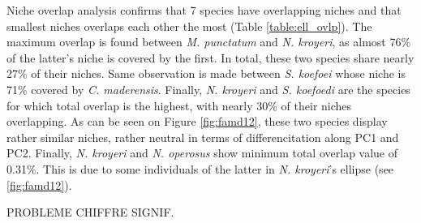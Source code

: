 Niche overlap analysis confirms that 7 species have overlapping niches and that smallest niches overlaps each other the most (Table \ref{table:ell_ovlp}). The maximum overlap is found between \textit{M. punctatum} and \textit{N. kroyeri}, as almost 76\% of the latter's niche is covered by the first. In total, these two species share nearly 27\% of their niches. Same observation is made between \textit{S. koefoei} whose niche is 71\% covered by \textit{C. maderensis}. Finally, \textit{N. kroyeri} and \textit{S. koefoedi} are the species for which total overlap is the highest, with nearly 30\% of their niches overlapping. As can be seen on Figure \ref{fig:famd12}, these two species display rather similar niches, rather neutral in terms of differencitation along PC1 and PC2. Finally, \textit{N. kroyeri} and \textit{N. operosus} show minimum total overlap value of 0.31\%. This is due to some individuals of the latter in \textit{N. kroyeri}'s ellipse (see \ref{fig:famd12}). 



PROBLEME CHIFFRE SIGNIF.

